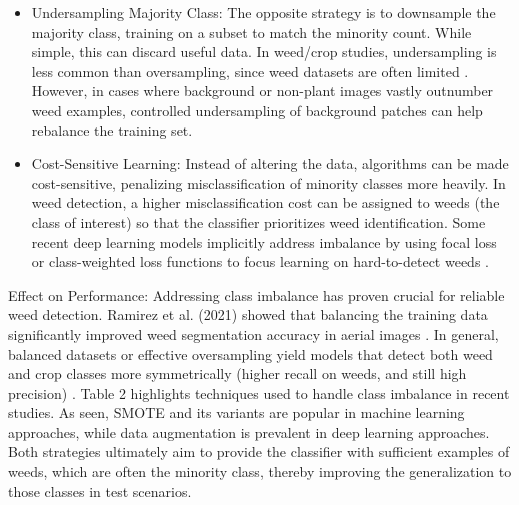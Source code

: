 \documentclass[letterpaper]{report}
\begin{document}
\begin{itemize}
	\item{Undersampling Majority Class: The opposite strategy is to downsample the majority class, training on a subset to match the minority count. While simple, this can discard useful data. In weed/crop studies, undersampling is less common than oversampling, since weed datasets are often limited \parencite{Mahmudul-Hasan2022-cj}. However, in cases where background or non-plant images vastly outnumber weed examples, controlled undersampling of background patches can help rebalance the training set.}  

	\item{Cost-Sensitive Learning: Instead of altering the data, algorithms can be made cost-sensitive, penalizing misclassification of minority classes more heavily. In weed detection, a higher misclassification cost can be assigned to weeds (the class of interest) so that the classifier prioritizes weed identification. Some recent deep learning models implicitly address imbalance by using focal loss or class-weighted loss functions to focus learning on hard-to-detect weeds \parencite{Wu2021-gt}. } 
\end{itemize}

Effect on Performance: Addressing class imbalance has proven crucial for reliable weed detection. Ramirez et al. (2021) showed that balancing the training data significantly improved weed segmentation accuracy in aerial images \parencite{Wu2021-gt}. In general, balanced datasets or effective oversampling yield models that detect both weed and crop classes more symmetrically (higher recall on weeds, and still high precision) \parencite{Bazrafkan2024-bl}. Table 2 highlights techniques used to handle class imbalance in recent studies. As seen, SMOTE and its variants are popular in machine learning approaches, while data augmentation is prevalent in deep learning approaches. Both strategies ultimately aim to provide the classifier with sufficient examples of weeds, which are often the minority class, thereby improving the generalization to those classes in test scenarios.  
\end{document}
